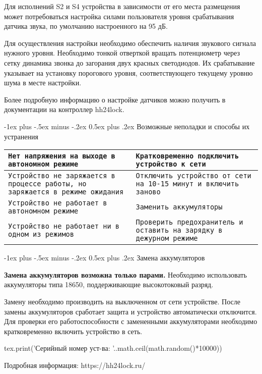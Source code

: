 \documentclass[a4paper,10pt,landscape]{article}
\makeatletter
\renewcommand{\section}{\@startsection{section}{1}{0mm}%
                                {-1ex plus -.5ex minus -.2ex}%
                                {0.5ex plus .2ex}%
                                {\normalfont\large\bfseries}}
\makeatother
\begin{document}
\begin{multicols}{3}
Для исполнений S2 и S4 устройства в зависимости от его места размещения может потребоваться настройка силами пользователя уровня срабатывания датчика звука, по умолчанию настроенного на 95 дБ. 

Для осуществления настройки необходимо обеспечить наличия звукового сигнала нужного уровня. Необходимо тонкой отверткой вращать потенциометр через сетку динамика звонка до загорания двух красных светодиодов. Их срабатывание указывает на установку порогового уровня, соответствующего текущему уровню шума в месте настройки. 

Более подробную информацию о настройке датчиков можно получить в документации на контроллер hh24lock.

\section{Возможные неполадки и способы их устранения}

\noindent\begin{tabular}{p{4cm}|p{4cm}}
\hline
\texttt{Нет напряжения на выходе в автономном режиме}&\texttt{Кратковременно подключить устройство к сети}\\
\hline
\texttt{Устройство не заряжается в процессе работы, но заряжается в режиме ожидания}&\texttt{Отключить устройство от сети на 10-15 минут и включить заново}\\
\hline
\texttt{Устройство не работает в автономном режиме}&\texttt{Заменить аккумуляторы}\\
\hline
\texttt{Устройство не работает ни в одном из режимов}&\texttt{Проверить предохранитель и оставить на зарядку в дежурном режиме}\\
\hline
\end{tabular}

\section{Замена аккумуляторов}

\textbf{Замена аккумуляторов возможна только парами.} Необходимо использовать аккумуляторы типа 18650, поддерживающие высокотоковый разряд. 

Замену необходимо производить на выключенном от сети устройстве. После замены аккумуляторов сработает защита и устройство автоматически отключится. Для проверки его работоспособности с замененными аккумуляторами необходимо кратковременно включить устройство в сеть. 

\Large{	
\begin{luacode}
tex.print('Серийный номер уст-ва: '..math.ceil(math.random()*10000))
\end{luacode}
\par
Подробная информация: https://hh24lock.ru/
}

\end{multicols}
\end{document}
